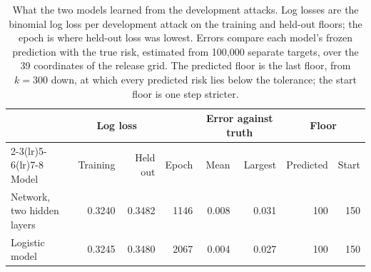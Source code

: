 \begin{table}[t]
\centering
\caption{What the two models learned from the development attacks. Log losses are the binomial log loss per development attack on the training and held-out floors; the epoch is where held-out loss was lowest. Errors compare each model's frozen prediction with the true risk, estimated from 100{,}000 separate targets, over the 39 coordinates of the release grid. The predicted floor is the last floor, from $k=300$ down, at which every predicted risk lies below the tolerance; the start floor is one step stricter.}
\label{tab:neural-fit}
\small\setlength{\tabcolsep}{4pt}
\begin{tabular}{lrrrrrrr}
\toprule
 & \multicolumn{2}{c}{Log loss} & & \multicolumn{2}{c}{Error against truth} & \multicolumn{2}{c}{Floor}\\
\cmidrule(lr){2-3}\cmidrule(lr){5-6}\cmidrule(lr){7-8}
Model & Training & Held out & Epoch & Mean & Largest & Predicted & Start \\
\midrule
Network, two hidden layers & 0.3240 & 0.3482 & 1146 & 0.008 & 0.031 & 100 & 150 \\
Logistic model & 0.3245 & 0.3480 & 2067 & 0.004 & 0.027 & 100 & 150 \\
\bottomrule
\end{tabular}
\end{table}
